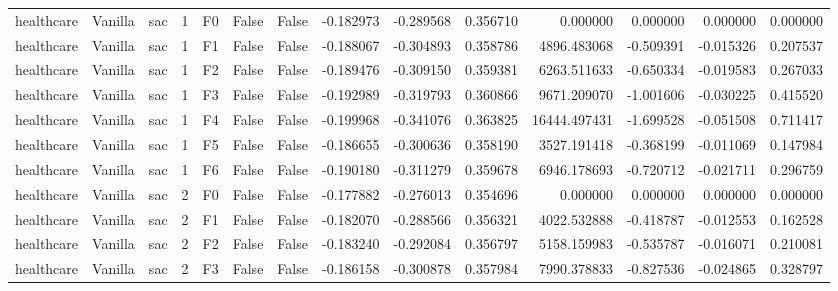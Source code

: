 \begin{tabular}{lllrlllrrrrrrr}
healthcare & Vanilla &       sac &     1 &  F0 &           False &            False & -0.182973 & -0.289568 & 0.356710 &         0.000000 &           0.000000 &        0.000000 &            0.000000 \\
healthcare & Vanilla &       sac &     1 &  F1 &           False &            False & -0.188067 & -0.304893 & 0.358786 &      4896.483068 &          -0.509391 &       -0.015326 &            0.207537 \\
healthcare & Vanilla &       sac &     1 &  F2 &           False &            False & -0.189476 & -0.309150 & 0.359381 &      6263.511633 &          -0.650334 &       -0.019583 &            0.267033 \\
healthcare & Vanilla &       sac &     1 &  F3 &           False &            False & -0.192989 & -0.319793 & 0.360866 &      9671.209070 &          -1.001606 &       -0.030225 &            0.415520 \\
healthcare & Vanilla &       sac &     1 &  F4 &           False &            False & -0.199968 & -0.341076 & 0.363825 &     16444.497431 &          -1.699528 &       -0.051508 &            0.711417 \\
healthcare & Vanilla &       sac &     1 &  F5 &           False &            False & -0.186655 & -0.300636 & 0.358190 &      3527.191418 &          -0.368199 &       -0.011069 &            0.147984 \\
healthcare & Vanilla &       sac &     1 &  F6 &           False &            False & -0.190180 & -0.311279 & 0.359678 &      6946.178693 &          -0.720712 &       -0.021711 &            0.296759 \\
healthcare & Vanilla &       sac &     2 &  F0 &           False &            False & -0.177882 & -0.276013 & 0.354696 &         0.000000 &           0.000000 &        0.000000 &            0.000000 \\
healthcare & Vanilla &       sac &     2 &  F1 &           False &            False & -0.182070 & -0.288566 & 0.356321 &      4022.532888 &          -0.418787 &       -0.012553 &            0.162528 \\
healthcare & Vanilla &       sac &     2 &  F2 &           False &            False & -0.183240 & -0.292084 & 0.356797 &      5158.159983 &          -0.535787 &       -0.016071 &            0.210081 \\
healthcare & Vanilla &       sac &     2 &  F3 &           False &            False & -0.186158 & -0.300878 & 0.357984 &      7990.378833 &          -0.827536 &       -0.024865 &            0.328797 \\

\end{tabular}
